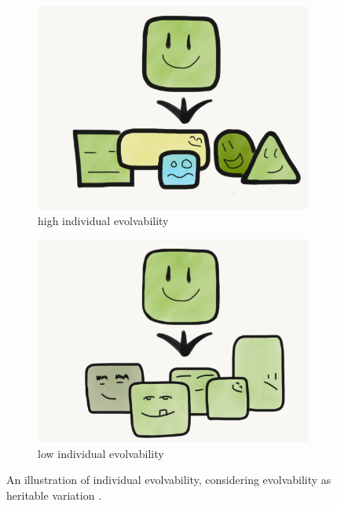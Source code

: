 \begin{figure}
 \centering
    \begin{subfigure}[b]{0.5\textwidth}
        \centering
    	\includegraphics[width=\textwidth]{img/individual_evolvability.png}
        \caption{high individual evolvability}
        \label{subfig:canalization}
    \end{subfigure}%
    \hfill
    \begin{subfigure}[b]{0.5\textwidth}
        \centering
        \includegraphics[width=\textwidth]{img/low_individual_evolvability.png}
        \caption{low individual evolvability}
        \label{subfig:no_canalization}
    \end{subfigure}
 	\captionsetup{singlelinecheck=off,justification=raggedright}
    \vspace{-4ex}
  \captionsetup{singlelinecheck=off,justification=raggedright}
  \caption{An illustration of individual evolvability, considering evolvability as heritable variation \cite{Wilder2015ReconcilingEvolvability}.}
  \label{fig:high_vs_low_individual_evolvability}
\end{figure}